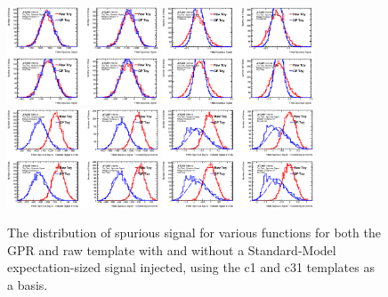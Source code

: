 \begin{figure} 
\begin{center}
  \subfloat[c1, NoSig]\includegraphics[width=0.4\textwidth]{figures/background/gpr/validation/ToyTest_FitSigVals_Merged_Category_c1NoSig.eps}
  \subfloat[c31, NoSig]\includegraphics[width=0.4\textwidth]{figures/background/gpr/validation/ToyTest_FitSigVals_Merged_Category_c31NoSig.eps}
  \subfloat[c1, Sig]\includegraphics[width=0.4\textwidth]{figures/background/gpr/validation/ToyTest_FitSigVals_Merged_Category_c1Sig.eps}
  \subfloat[c31, Sig]\includegraphics[width=0.4\textwidth]{figures/background/gpr/validation/ToyTest_FitSigVals_Merged_Category_c31Sig.eps}  
   \caption{The distribution of spurious signal for various functions for both the GPR and raw template with and without a Standard-Model expectation-sized signal injected, using the c1 and c31 templates as a basis.}
\label{fig:c1NoSig}
\end{center}
\end{figure}

\clearpage

